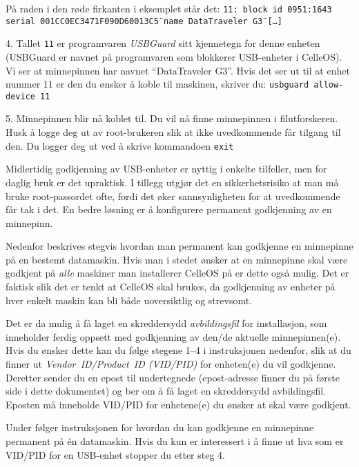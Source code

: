 \item{} P\aa{} raden i den r\o de firkanten i eksemplet st\aa r det:
\smallskip
{\tt 11: block id 0951:1643 serial \"{}001CC0EC3471F090D60013C5\"{} name \"{}DataTraveler G3\"{}{} [\dots]}
\medskip
\item{4. } Tallet {\tt 11} er programvaren {\it USBGuard} sitt kjennetegn for denne enheten (USBGuard er navnet p\aa{} programvaren som blokkerer USB-enheter i CelleOS). Vi ser at minnepinnen har navnet ``DataTraveler G3''. Hvis det ser ut til at enhet nummer 11 er den du \o nsker \aa{} koble til maskinen, skriver du:
\medskip
{\tt usbguard allow-device 11}
\medskip
\item{5.} Minnepinnen blir n\aa{} koblet til. Du vil n\aa{} finne minnepinnen i filutforskeren. Husk \aa{} logge deg ut av root-brukeren slik at ikke uvedkommende f\aa r tilgang til den. Du logger deg ut ved \aa{} skrive kommandoen
\medskip
{\tt exit}
\medskip


Midlertidig godkjenning av USB-enheter er nyttig i enkelte tilfeller, men for daglig bruk er det upraktisk. I tillegg utgj\o r det en sikkerhetsrisiko at man m\aa{} bruke root-passordet ofte, fordi det \o ker sannsynligheten for at uvedkommende f\aa r tak i det. En bedre l\o sning er \aa{} konfigurere permanent godkjenning av en minnepinn.

Nedenfor beskrives stegvis hvordan man permanent kan godkjenne en minnepinne p\aa{} en bestemt datamaskin. Hvis man i stedet \o nsker at en minnepinne skal v\ae re godkjent p\aa{} {\it alle} maskiner man installerer CelleOS p\aa{} er dette ogs\aa{} mulig. Det er faktisk slik det er tenkt at CelleOS skal brukes, da godkjenning av enheter p\aa{} hver enkelt maskin kan bli b\aa de uoversiktlig og strevsomt.

Det er da mulig \aa{} f\aa{} laget en skreddersydd {\it avbildingsfil} for installasjon, som inneholder ferdig oppsett med godkjenning av den/de aktuelle minnepinnen(e). Hvis du \o nsker dette kan du f\o lge stegene 1--4 i instruksjonen nedenfor, slik at du finner ut {\it Vendor~ID/Product~ID (VID/PID)\/} for enheten(e) du vil godkjenne. Deretter sender du en epost til undertegnede (epost-adresse finner du p\aa{} f\o rste side i dette dokumentet) og ber om \aa{} f\aa{} laget en skreddersydd avbildingsfil. Eposten m\aa{} inneholde VID/PID for enhetene(e) du \o nsker at skal v\ae re godkjent. 

Under f\o lger instruksjonen for hvordan du kan godkjenne en minnepinne permanent p\aa{} \'en datamaskin. Hvis du kun er interessert i \aa{} finne ut hva som er VID/PID for en USB-enhet stopper du etter steg 4.

